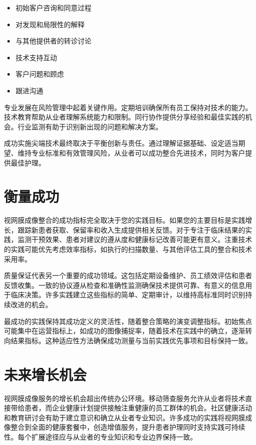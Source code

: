 \documentclass[
  Letterpaper,
]{scrbook}
\providecommand{\tightlist}{%
  \setlength{\itemsep}{0pt}\setlength{\parskip}{0pt}}\usepackage{longtable,booktabs,array}
\begin{document}
\begin{itemize}
\tightlist
\item
  初始客户咨询和同意过程
\item
  对发现和局限性的解释
\item
  与其他提供者的转诊讨论
\item
  技术支持互动
\item
  客户问题和顾虑
\item
  跟进沟通
\end{itemize}

专业发展在风险管理中起着关键作用。定期培训确保所有员工保持对技术的能力。技术教育帮助从业者理解系统能力和限制。同行协作提供分享经验和最佳实践的机会。行业监测有助于识别新出现的问题和解决方案。

成功实施尖端技术最终取决于平衡创新与责任。通过理解证据基础、设定适当期望、维持专业标准和有效管理风险，从业者可以成功整合先进技术，同时为客户提供最佳护理。

\section{衡量成功}\label{ux8861ux91cfux6210ux529f}

视网膜成像整合的成功指标完全取决于您的实践目标。如果您的主要目标是实践增长，跟踪新患者获取、保留率和收入生成提供相关反馈。对于专注于临床结果的实践，监测干预效果、患者对建议的遵从度和健康标记改善可能更有意义。注重技术的实践可能优先考虑效率指标，如执行的扫描数量、与其他评估工具的整合和技术采用率。

质量保证代表另一个重要的成功领域。这包括定期设备维护、员工绩效评估和患者反馈收集。一致的协议遵从检查和准确性监测确保技术提供可靠、有意义的信息用于临床决策。许多实践建立这些指标的简单、定期审计，以维持高标准同时识别持续改进的机会。

最成功的实践保持其成功定义的灵活性，随着整合策略的演变调整指标。初始焦点可能集中在运营指标上，如成功的图像捕捉率，随着技术在实践中的确立，逐渐转向结果指标。这种适应性方法确保成功测量与当前实践优先事项和目标保持一致。

\section{未来增长机会}\label{ux672aux6765ux589eux957fux673aux4f1a}

视网膜成像服务的增长机会超出传统办公环境。移动筛查服务允许从业者将技术直接带给患者，而企业健康计划提供接触注重健康的员工群体的机会。社区健康活动和教育研讨会有助于建立意识和确立从业者专业知识。许多成功的实践将视网膜成像整合到全面的健康套餐中，创造增值服务，提升患者护理同时支持实践可持续性。每个扩展途径应与从业者的专业知识和专业边界保持一致。
\end{document}
